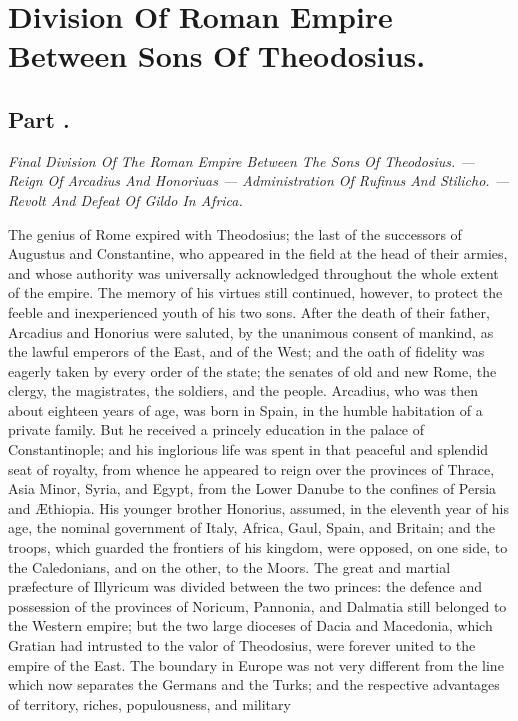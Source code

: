 \chapter{Division Of Roman Empire Between Sons Of Theodosius.}
\section{Part \thesection.}

\textit{Final Division Of The Roman Empire Between The Sons Of
Theodosius. — Reign Of Arcadius And Honoriuas — Administration Of
Rufinus And Stilicho. — Revolt And Defeat Of Gildo In Africa.}

The genius of Rome expired with Theodosius; the last of the
successors of Augustus and Constantine, who appeared in the field
at the head of their armies, and whose authority was universally
acknowledged throughout the whole extent of the empire. The
memory of his virtues still continued, however, to protect the
feeble and inexperienced youth of his two sons. After the death
of their father, Arcadius and Honorius were saluted, by the
unanimous consent of mankind, as the lawful emperors of the East,
and of the West; and the oath of fidelity was eagerly taken by
every order of the state; the senates of old and new Rome, the
clergy, the magistrates, the soldiers, and the people. Arcadius,
who was then about eighteen years of age, was born in Spain, in
the humble habitation of a private family. But he received a
princely education in the palace of Constantinople; and his
inglorious life was spent in that peaceful and splendid seat of
royalty, from whence he appeared to reign over the provinces of
Thrace, Asia Minor, Syria, and Egypt, from the Lower Danube to
the confines of Persia and Æthiopia. His younger brother
Honorius, assumed, in the eleventh year of his age, the nominal
government of Italy, Africa, Gaul, Spain, and Britain; and the
troops, which guarded the frontiers of his kingdom, were opposed,
on one side, to the Caledonians, and on the other, to the Moors.
The great and martial præfecture of Illyricum was divided
between the two princes: the defence and possession of the
provinces of Noricum, Pannonia, and Dalmatia still belonged to
the Western empire; but the two large dioceses of Dacia and
Macedonia, which Gratian had intrusted to the valor of
Theodosius, were forever united to the empire of the East. The
boundary in Europe was not very different from the line which now
separates the Germans and the Turks; and the respective
advantages of territory, riches, populousness, and military
